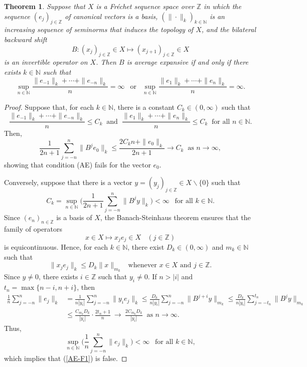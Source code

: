 \documentclass[12pt]{amsart}
\theoremstyle{theorem}
\newtheorem{theorem}{Theorem}%
\theoremstyle{definition}
\theoremstyle{remark} \theoremstyle{question} \theoremstyle{example}
\newcommand{\N}{\mathbb{N}}   %
\newcommand{\Z}{\mathbb{Z}}   %
\begin{document}
\begin{theorem}\label{AE-T1}
Suppose that $X$ is a Fréchet sequence space over $\Z$ in which the sequence $(e_j)_{j \in \Z}$ of canonical vectors is a basis,
$(\|\cdot\|_k)_{k \in \N}$ is an increasing sequence of seminorms that induces the topology of $X$,
and the bilateral backward shift 
\[
B : (x_j)_{j \in \Z} \in X \mapsto (x_{j+1})_{j \in \Z} \in X
\]
is an invertible operator on $X$. Then $B$ is average expansive if and only if there exists $k \in \N$ such that
\begin{equation}\label{AE-F1}
\sup_{n \in \N} \frac{\|e_{-1}\|_k + \cdots + \|e_{-n}\|_k}{n} = \infty \ \ \text{ or } \ \
\sup_{n \in \N} \frac{\|e_1\|_k + \cdots + \|e_n\|_k}{n} = \infty.
\end{equation}
\end{theorem}

\begin{proof}
Suppose that, for each $k \in \N$, there is a constant $C_k \in (0,\infty)$ such that
\[
\frac{\|e_{-1}\|_k + \cdots + \|e_{-n}\|_k}{n} \leq C_k \ \text{ and } \
\frac{\|e_1\|_k + \cdots + \|e_n\|_k}{n} \leq C_k \ \text{ for all } n \in \N.
\]
Then,
\[
\frac{1}{2n+1} \sum_{j=-n}^n \|B^j e_0\|_k \leq \frac{2 C_k n + \|e_0\|_k}{2n+1} \to C_k \ \text{ as } n \to \infty,
\]
showing that condition (AE) fails for the vector $e_0$.

Conversely, suppose that there is a vector $y = (y_j)_{j \in \Z} \in X \backslash \{0\}$ such that
\[
C_k = \sup_{n \in \N} \Big(\frac{1}{2n+1} \sum_{j=-n}^n \|B^j y\|_k \Big) < \infty \ \ \text{ for all } k \in \N.
\]
Since $(e_n)_{n \in \Z}$ is a basis of $X$, the Banach-Steinhaus theorem ensures that the family of operators
\[
x \in X \mapsto x_j e_j \in X \ \ \ \ (j \in \Z)
\]
is equicontinuous. Hence, for each $k \in \N$, there exist $D_k \in (0,\infty)$ and $m_k \in \N$ such that
\[
\|x_je_j\|_k \leq D_k \|x\|_{m_k} \ \ \text{ whenever } x \in X \text{ and } j \in \Z.
\]
Since $y \neq 0$, there exists $i \in \Z$ such that $y_i \neq 0$.
If $n > |i|$ and $t_n = \max\{n-i,n+i\}$, then
\begin{align*}
\frac{1}{n} \sum_{j=-n}^{n} \|e_j\|_k 
&= \frac{1}{n|y_i|} \sum_{j=-n}^{n} \|y_ie_j\|_k 
  \leq \frac{D_k}{n|y_i|} \sum_{j=-n}^{n} \|B^{j+i}y\|_{m_k}
  \leq \frac{D_k}{n|y_i|} \sum_{j=-t_n}^{t_n} \|B^jy\|_{m_k}\\
&\leq \frac{C_{m_k}D_k}{|y_i|} \cdot \frac{2t_n + 1}{n}
  \ \to \ \frac{2C_{m_k}D_k}{|y_i|} \ \text{ as } n \to \infty.
\end{align*}
Thus,
\[
\sup_{n \in \N} \Big(\frac{1}{n} \sum_{j=-n}^{n} \|e_j\|_k\Big) < \infty \ \ \text{ for all } k \in \N,
\]
which implies that (\ref{AE-F1}) is false.
\end{proof}
\end{document}
